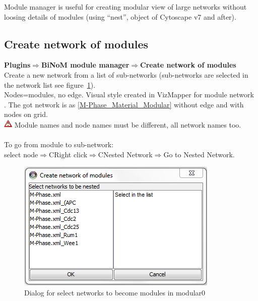 Module manager is useful for creating modular view of large networks without loosing details of modules (using “nest”, object of Cytoscape v7 and after).

\subsection{Create network of modules}
\textbf{Plugins$\Rightarrow$BiNoM module manager$\Rightarrow$Create network of modules}\\
Create a new network from a list of sub-networks (sub-networks are selected in the network list see figure~\ref{Create_network_of_modules}).\\
Nodes=modules, no edge. Visual style created in VizMapper for module network . The got network is as \ref{M-Phase_Material_Modular} without edge and with nodes on grid.\\
\includegraphics[width=12pt,height=12pt]{graphics/warning} Module names and node names must be different, all network names too.\\\\
To go from module to sub-network:\\
select node$\Rightarrow$CRight click$\Rightarrow$CNested Network$\Rightarrow$Go to Nested Network.
\begin{figure}
\centering
\includegraphics[width=14 cm]{graphics/Create_network_of_modules}
\caption{Dialog for select networks to become modules in modular0}
\label{Create_network_of_modules}
\end{figure}

